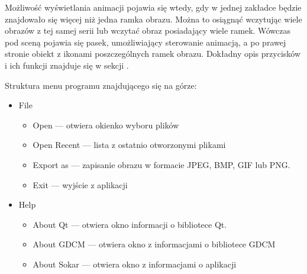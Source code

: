 \par
Możliwość wyświetlania animacji pojawia się wtedy, gdy w jednej zakładce będzie znajdowało się więcej niż jedna ramka obrazu.
Można to osiągnąć wczytując wiele obrazów z tej samej serii lub wczytać obraz posiadający wiele ramek.
Wówczas pod sceną pojawia się pasek, umożliwiający sterowanie animacją, a po prawej stronie obiekt z ikonami poszczególnych ramek obrazu.
Dokładny opis przycisków i ich funkcji znajduje się w sekcji .


\par
Struktura menu programu znajdującego się na górze:
\begin{itemize}
    \item File
          \begin{itemize}
              \item Open --- otwiera okienko wyboru plików
              \item Open Recent --- lista z ostatnio otworzonymi plikami
              \item Export as --- zapisanie obrazu w formacie JPEG, BMP, GIF lub PNG.
              \item Exit --- wyjście z aplikacji
          \end{itemize}
    \item Help
          \begin{itemize}
              \item About Qt --- otwiera okno informacji o bibliotece Qt.
              \item About GDCM --- otwiera okno z informacjami o bibliotece GDCM
              \item About Sokar --- otwiera okno z informacjami o aplikacji
          \end{itemize}
\end{itemize}